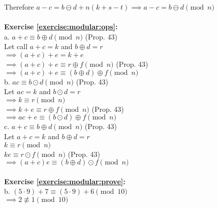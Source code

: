 Therefore $a-c=b \ominus d +n(k+s-t) \implies a-c=b \ominus d \pmod{n}$\\
\\
\textbf{Exercise \ref{exercise:modular:ops}:}\\
a. $a+c \equiv b \oplus d \pmod{n}$ (Prop. 43)\\
Let call $a+c=k$ and $b \oplus d=r$\\
$\implies (a+c)+e=k+e$\\
$\implies (a+c)+e \equiv r \oplus f \pmod{n}$ (Prop. 43)\\
$\implies (a+c)+e \equiv (b \oplus d) \oplus f \pmod{n}$\\
b. $ac \equiv b \odot d \pmod{n}$ (Prop. 43)\\
Let $ac=k$ and $b \odot d =r$\\
$\implies k \equiv r \pmod{n}$\\
$\implies k+e \equiv r \oplus f \pmod{n}$ (Prop. 43)\\
$\implies ac+e \equiv (b \odot d) \oplus f \pmod{n}$\\
c. $a+c \equiv b \oplus d \pmod{n}$ (Prop. 43)\\
Let $a+c=k$ and $b \oplus d =r$\\
$k \equiv r \pmod{n}$\\
$ke \equiv r \odot f \pmod{n}$ (Prop. 43)\\
$\implies (a+c)e \equiv (b \oplus d) \odot f \pmod{n}$\\
\\

\textbf{Exercise \ref{exercise:modular:prove}:}\\
b. $(5 \cdot 9)+7 \equiv (5 \cdot 9)+6 \pmod{10}$\\
$\implies 2 \not\equiv 1 \pmod{10}$\\

